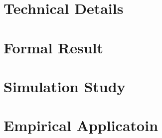 \documentclass[12pt]{article}
\begin{document}
\clearpage
\begingroup
{}


\endgroup

\clearpage
\appendix
{}
\renewcommand{\theequation}{\thesection.\arabic{equation}}
\setcounter{equation}{0}
\renewcommand{\theassumption}{\thesection.\arabic{assumption}}
\setcounter{assumption}{1}
\renewcommand{\thefigure}{\thesection.\arabic{figure}}
\setcounter{figure}{0}
\renewcommand{\thetable}{\thesection.\arabic{table}}
\setcounter{figure}{0}

\section{Technical Details} 
\label{sec: tech details}

\section{Formal Result} 
\label{sec: formal result}

\section{Simulation Study} 
\label{sec: simulation app}

\section{Empirical Applicatoin} 
\label{sec: application app}
\end{document}
